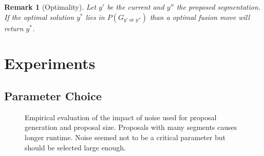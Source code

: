 \documentclass[10pt,twocolumn,letterpaper]{article}
\newtheorem{remark}{Remark}
\newcommand{\OR}{\textrm{ or }}
\begin{document}
\begin{remark}[Optimality]
Let $y'$ be the current and $y''$ the proposed segmentation.
If the optimal solution $y^*$ lies in $P(G_{y' \OR y''})$ than a optimal fusion move will return $y^*$.
\end{remark}



\section{Experiments}\label{sec:exp}

\subsection{Parameter Choice}
\begin{figure}
\centering
{}
\caption{Empirical evaluation of the impact of noise used for proposal generation and proposal size.
  Proposals with many segments causes longer runtime. Noise seemed not to be a critical parameter but should be selected large enough.
}
\end{figure}
\end{document}
